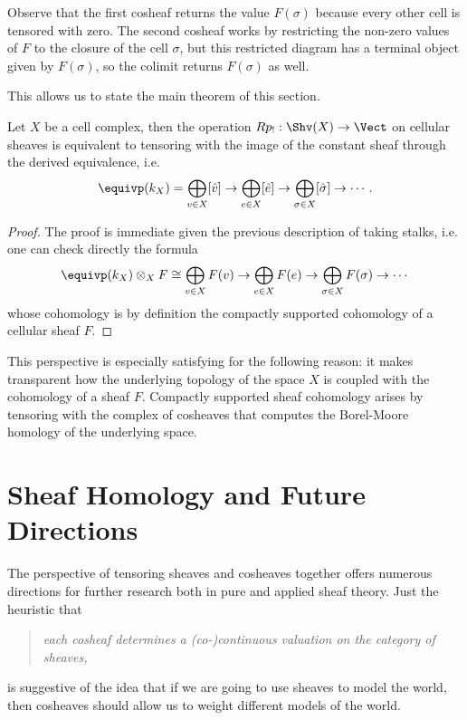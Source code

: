 Observe that the first cosheaf returns the value $F(\sigma)$ because every other cell is tensored with zero. The second cosheaf works by restricting the non-zero values of $F$ to the closure of the cell $\sigma$, but this restricted diagram has a terminal object given by $F(\sigma)$, so the colimit returns $F(\sigma)$ as well.

This allows us to state the main theorem of this section.

\begin{thm}
	Let $X$ be a cell complex, then the operation $Rp_!:\Shv(X)\to\Vect$ on cellular sheaves is equivalent to tensoring with the image of the constant sheaf through the derived equivalence, i.e.
	\[
		\equivp(k_X)= \bigoplus_{v\in X} [\hat{v}] \to \bigoplus_{e\in X} [\hat{e}] \to \bigoplus_{\sigma\in X} [\hat{\sigma}] \to \cdots.
	\]
\end{thm}
\begin{proof}
	The proof is immediate given the previous description of taking stalks, i.e. one can check directly the formula
	\[
		\equivp(k_X)\otimes_X F \cong \bigoplus_{v\in X} F(v) \to \bigoplus_{e\in X} F(e) \to \bigoplus_{\sigma\in X} F(\sigma) \to \cdots
	\]
	whose cohomology is by definition the compactly supported cohomology of a cellular sheaf $F$.
\end{proof}

This perspective is especially satisfying for the following reason: it makes transparent how the underlying topology of the space $X$ is coupled with the cohomology of a sheaf $F$. Compactly supported sheaf cohomology arises by tensoring with the complex of cosheaves that computes the Borel-Moore homology of the underlying space.

\section{Sheaf Homology and Future Directions}
The perspective of tensoring sheaves and cosheaves together offers numerous directions for further research both in pure and applied sheaf theory. Just the heuristic that
\begin{quote}
\begin{center}
	\emph{each cosheaf determines a (co-)continuous valuation on the category of sheaves,}
\end{center}
\end{quote}
is suggestive of the idea that if we are going to use sheaves to model the world, then cosheaves should allow us to weight different models of the world.

